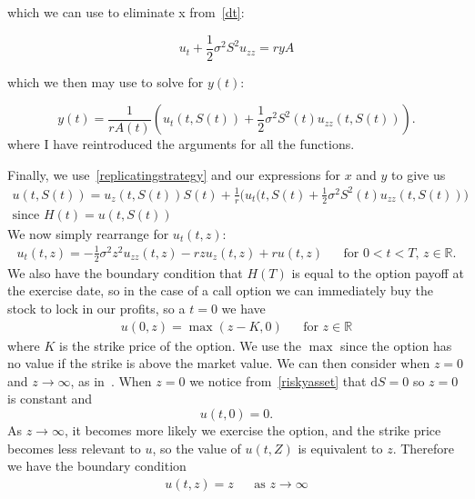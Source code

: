 \documentclass[11pt]{article} %
\begin{document}
which we can use to eliminate x from~\eqref{dt}:

\begin{equation}
    u_t + \frac{1}{2}\sigma ^2 S^2u_{zz} = ryA
\end{equation}

which we then may use to solve for $y(t)$:

\begin{equation}
    y(t) = \frac{1}{rA(t)}(u_t(t,S(t)) + \frac{1}{2} \sigma^2S^2(t)u_{zz}(t,S(t)) ).
\end{equation}
where I have reintroduced the arguments for all the functions.

Finally, we use~\eqref{replicatingstrategy} and our expressions for $x$ and $y$ to give us
\begin{align}
    u(t,S(t)) = u_z(t,S(t))S(t) + \frac{1}{r}\bigg(u_t(t,S(t) + \frac{1}{2}\sigma^2S^2(t)
    u_{zz}(t,S(t))\bigg) \\\text{since $H(t) = u(t,S(t))$}
\end{align}
We now simply rearrange for $u_t(t,z)$:
\begin{align}\label{blackscholes}
    u_t(t,z) = -\frac{1}{2}\sigma^2z^2u_{zz}(t,z) - rzu_z(t,z) + ru(t,z) 
   && \text{for $0<t<T$, $z \in \mathbb{R}$.}
\end{align}
We also have the boundary condition that $H(T)$ is equal to the option payoff at the exercise 
date, so in the case of a call option we can immediately buy the stock to lock in our profits, 
so a $t=0$ we have
\begin{align} \label{initialvalue}
    u(0,z) = \max{(z - K , 0)} && \text{for $z \in \mathbb{R}$}
\end{align}
where $K$ is the strike price of the option. We use the $\max$ since the option has no value 
if the strike is above the market value. We can then consider when $z=0$ and 
$z \to \infty$, as in~\cite{scholesapplication}. When $z=0$ we notice from~\eqref{riskyasset} 
that $\mathrm{d}S = 0$ so $z = 0$ is constant and
\begin{equation} \label{boundarycondition}
    u(t,0) = 0.
\end{equation}
As $z \to \infty$, it becomes more likely we exercise the option, and the strike price 
becomes less relevant to $u$, so the value of $u(t,Z)$ is equivalent to $z$. Therefore 
we have the boundary condition 
\begin{align} 
    u(t,z) = z && \text{as $z \to \infty$}
\end{align}
\end{document}
